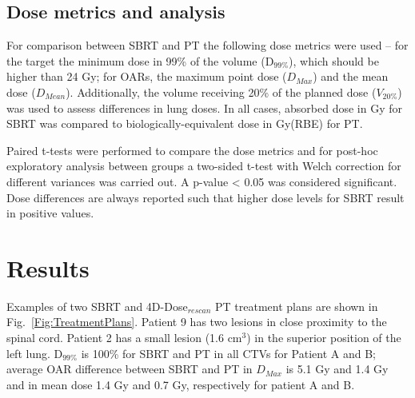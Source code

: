 \documentclass[type=dr, dr=rernat, acm$^3$entcolor=tud7b,colorbacktitle, bigchapter, openright, twoside, 12pt ]{tudthesis}
\begin{document}

\subsection{Dose metrics and analysis}

For comparison between SBRT and PT the following dose metrics were used – for the target the minimum dose in 99\% of the volume (D$_{99\%}$), which should be higher than 24 Gy; for OARs, the maximum point dose ($D_{Max}$) and the mean dose ($D_{Mean}$). Additionally, the volume receiving 20\% of the planned dose ($V_{20\%}$) was used to assess differences in lung doses. In all cases, absorbed dose in Gy for SBRT was compared to biologically-equivalent dose in Gy(RBE) for PT.

Paired t-tests were performed to compare the dose metrics and for post-hoc exploratory analysis between groups a two-sided t-test with Welch correction for different variances was carried out. A p-value < 0.05 was considered significant. Dose differences are always reported such that higher dose levels for SBRT result in positive values.



\section{Results}

Examples of two SBRT and 4D-Dose$_{rescan}$ PT treatment plans are shown in Fig.~\ref{Fig:TreatmentPlans}. Patient 9 has two lesions in close proximity to the spinal cord. Patient 2 has a small lesion (1.6 cm$^{3}$) in the superior position of the left lung. D$_{99\%}$ is 100\% for SBRT and PT in all CTVs for Patient A and B; average OAR difference between SBRT and PT in $D_{Max}$ is 5.1 Gy and 1.4 Gy and in mean dose 1.4 Gy and 0.7 Gy, respectively for patient A and B.
\end{document}
